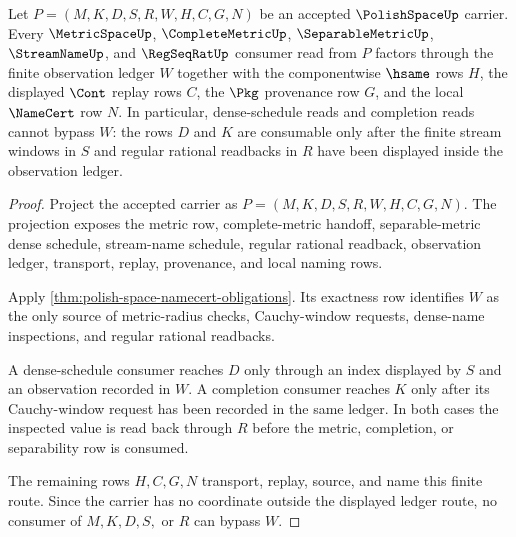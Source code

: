 \begin{theorem}
\label{thm:polish-space-observation-ledger-exhaustion}
Let $P=(M,K,D,S,R,W,H,C,G,N)$ be an accepted $\PolishSpaceUp$ carrier. Every
$\MetricSpaceUp$, $\CompleteMetricUp$, $\SeparableMetricUp$, $\StreamNameUp$,
and $\RegSeqRatUp$ consumer read from $P$ factors through the finite
observation ledger $W$ together with the componentwise $\hsame$ rows $H$, the
displayed $\Cont$ replay rows $C$, the $\Pkg$ provenance row $G$, and the local
$\NameCert$ row $N$. In particular, dense-schedule reads and completion reads
cannot bypass $W$: the rows $D$ and $K$ are consumable only after the finite
stream windows in $S$ and regular rational readbacks in $R$ have been displayed
inside the observation ledger.
\end{theorem}
\begin{proof}
Project the accepted carrier as $P=(M,K,D,S,R,W,H,C,G,N)$. The projection
exposes the metric row, complete-metric handoff, separable-metric dense
schedule, stream-name schedule, regular rational readback, observation ledger,
transport, replay, provenance, and local naming rows.

Apply \autoref{thm:polish-space-namecert-obligations}. Its exactness row
identifies $W$ as the only source of metric-radius checks, Cauchy-window
requests, dense-name inspections, and regular rational readbacks.

A dense-schedule consumer reaches $D$ only through an index displayed by $S$
and an observation recorded in $W$. A completion consumer reaches $K$ only
after its Cauchy-window request has been recorded in the same ledger. In both
cases the inspected value is read back through $R$ before the metric,
completion, or separability row is consumed.

The remaining rows $H,C,G,N$ transport, replay, source, and name this finite
route. Since the carrier has no coordinate outside the displayed ledger route,
no consumer of $M,K,D,S,$ or $R$ can bypass $W$.
\end{proof}

